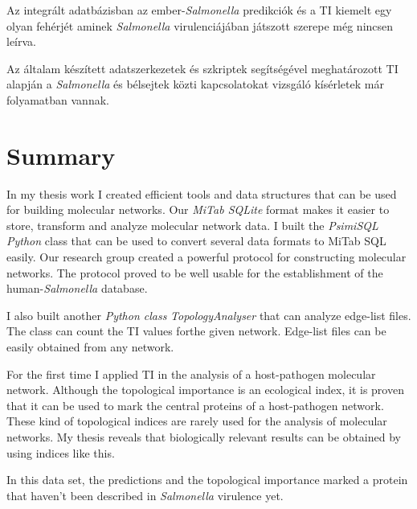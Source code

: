\documentclass[a4paper,12pt]{article}
\begin{document}
		\vspace{22pt} 
		
		Az integrált adatbázisban az ember-\textit{Salmonella} predikciók és a TI kiemelt egy olyan fehérjét aminek \textit{Salmonella} virulenciájában játszott szerepe még nincsen leírva.

		\vspace{22pt}
		
		Az általam készített adatszerkezetek és szkriptek segítségével meghatározott TI alapján a \textit{Salmonella} és bélsejtek közti kapcsolatokat vizsgáló kísérletek már folyamatban vannak.
		
		
		\pagebreak
		
		

\section{Summary}
		
		In my thesis work I created efficient tools and data structures that can be used for building molecular networks. Our \textit{MiTab SQLite} format makes it easier to  store, transform and analyze molecular network data. I built the \textit{PsimiSQL Python} class that can be used to convert several data formats to MiTab SQL easily. Our research group created a powerful protocol for constructing molecular networks. The protocol proved to be well usable for the establishment of the human-\textit{Salmonella} database.
		
		\vspace{22pt}
		
		I also built another \textit{Python class} \textit{TopologyAnalyser} that can analyze edge-list files. The class can count the TI values forthe given network. Edge-list files can be easily obtained from any network. 
		
		\vspace{22pt}
		
		For the first time I applied TI in the analysis of a host-pathogen molecular network. Although the topological importance is an ecological index, it is proven that it can be used to mark the central proteins of a host-pathogen network. These kind of topological indices are rarely used for the analysis of molecular networks. My thesis reveals that biologically relevant results can be obtained by using indices like this.
		
		\vspace{22pt} 
		
		In this data set, the predictions and the topological importance marked a protein that haven't been described in \textit{Salmonella} virulence yet.
		 
\end{document}
